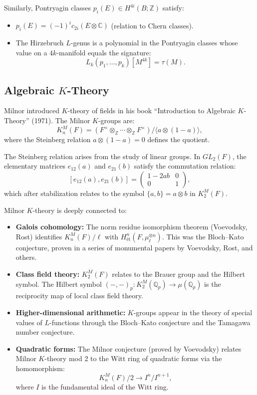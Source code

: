 Similarly, Pontryagin classes $p_i(E) \in H^{4i}(B; \mathbb{Z})$ satisfy:
\begin{itemize}
\item $p_i(E) = (-1)^i c_{2i}(E \otimes \mathbb{C})$ (relation to Chern classes).
\item The Hirzebruch $L$-genus is a polynomial in the Pontryagin classes whose value on a $4k$-manifold equals the signature:
\[
L_k(p_1, \ldots, p_k)[M^{4k}] = \tau(M).
\]
\end{itemize}

\subsection{Algebraic \texorpdfstring{$K$}{K}-Theory}

Milnor introduced $K$-theory of fields in his book ``Introduction to Algebraic $K$-Theory'' (1971). The Milnor $K$-groups are:
\[
K^M_n(F) = (F^\times \otimes_{\mathbb{Z}} \cdots \otimes_{\mathbb{Z}} F^\times) / \langle a \otimes (1-a) \rangle,
\]
where the Steinberg relation $a \otimes (1-a) = 0$ defines the quotient.

The Steinberg relation arises from the study of linear groups. In $GL_2(F)$, the elementary matrices $e_{12}(a)$ and $e_{21}(b)$ satisfy the commutation relation:
\[
[e_{12}(a), e_{21}(b)] = \begin{pmatrix} 1-2ab & 0 \\ 0 & 1 \end{pmatrix},
\]
which after stabilization relates to the symbol $\{a, b\} = a \otimes b$ in $K^M_2(F)$.

Milnor $K$-theory is deeply connected to:
\begin{itemize}
\item \textbf{Galois cohomology:} The norm residue isomorphism theorem (Voevodsky, Rost) identifies $K^M_n(F)/\ell$ with $H^n_{\text{\'et}}(F, \mu_\ell^{\otimes n})$. This was the Bloch--Kato conjecture, proven in a series of monumental papers by Voevodsky, Rost, and others.
\item \textbf{Class field theory:} $K^M_2(F)$ relates to the Brauer group and the Hilbert symbol. The Hilbert symbol $(-,-)_p : K^M_2(\mathbb{Q}_p) \to \mu(\mathbb{Q}_p)$ is the reciprocity map of local class field theory.
\item \textbf{Higher-dimensional arithmetic:} $K$-groups appear in the theory of special values of $L$-functions through the Bloch--Kato conjecture and the Tamagawa number conjecture.
\item \textbf{Quadratic forms:} The Milnor conjecture (proved by Voevodsky) relates Milnor $K$-theory mod 2 to the Witt ring of quadratic forms via the homomorphism:
\[
K^M_n(F)/2 \to I^n/I^{n+1},
\]
where $I$ is the fundamental ideal of the Witt ring.
\end{itemize}

